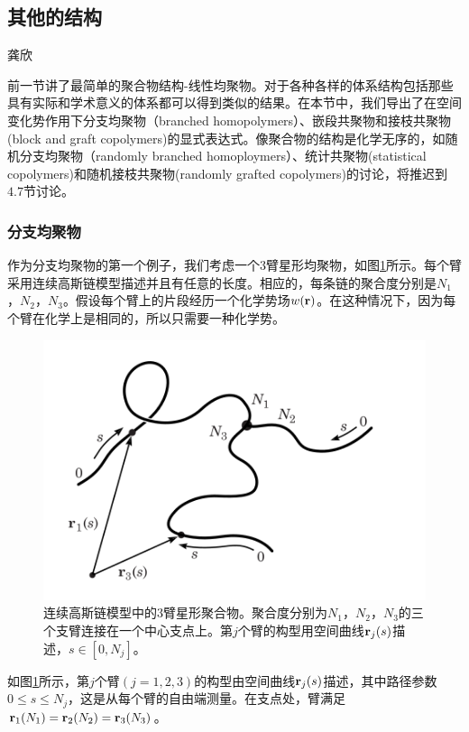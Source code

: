 \subsection{其他的结构}
\begin{center}
龚欣
\end{center}

前一节讲了最简单的聚合物结构-线性均聚物。对于各种各样的体系结构包括那些具有实际和学术意义的体系都可以得到类似的结果。在本节中，我们导出了在空间变化势作用下分支均聚物（branched homopolymers）、嵌段共聚物和接枝共聚物(block and graft copolymers)的显式表达式。像聚合物的结构是化学无序的，如随机分支均聚物（randomly branched homoploymers）、统计共聚物(statistical copolymers)和随机接枝共聚物(randomly grafted copolymers)的讨论，将推迟到$4.7$节讨论。
\subsubsection{分支均聚物}
作为分支均聚物的第一个例子，我们考虑一个$3$臂星形均聚物，如图\ref{三臂星形均聚物}所示。每个臂采用连续高斯链模型描述并且有任意的长度。相应的，每条链的聚合度分别是$N_1$，$N_2$，$N_3$。假设每个臂上的片段经历一个化学势场$w (\mathbf{r})$。在这种情况下，因为每个臂在化学上是相同的，所以只需要一种化学势。
\begin{figure}[H]
\centering
\includegraphics[scale=0.7]{./figures/34.png}
\caption{连续高斯链模型中的$3$臂星形聚合物。聚合度分别为$N_1$，$N_2$，$N_3$的三个支臂连接在一个中心支点上。第$j$个臂的构型用空间曲线$\mathbf{r}_j(s)$描述，$s\in [0,N_j]$。}
\label{三臂星形均聚物}
\end{figure}

如图\ref{三臂星形均聚物}所示，第$j$个臂$(j=1,2,3)$的构型由空间曲线$\mathbf{r}_j(s)$描述，其中路径参数$0\leq s\leq N_j$，这是从每个臂的自由端测量。在支点处，臂满足$\mathbf{r}_1(N_1)=\mathbf{r}_2(N_2)=\mathbf{r}_3(N_3)$。


